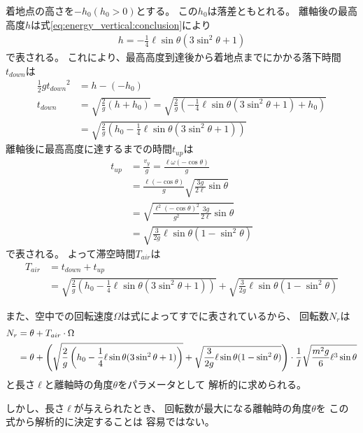 \documentclass[a4paper,11pt]{jsarticle}
\begin{document}
着地点の高さを$-h_0 (h_0>0)$とする。
この$h_0$は落差ともとれる。
離軸後の最高高度$h$は式\ref{eq:energy_vertical:conclusion}により
\begin{align*}
  h = -\frac{1}{4}\ell\sin\theta (3\sin^2\theta+1)
\end{align*}
で表される。
これにより、最高高度到達後から着地点までにかかる落下時間$t_{down}$は
\begin{align*}
  \frac{1}{2}g{t_{down}}^2
  &= h - (-h_0)
  \\
  t_{down}
  &= \sqrt{ \frac{2}{g} (h + h_0)}
  = \sqrt{ \frac{2}{g} \left( -\frac{1}{4}\ell\sin\theta (3\sin^2\theta+1) + h_0 \right) }
  \\
  & = \sqrt{ \frac{2}{g} \left( h_0 - \frac{1}{4}\ell\sin\theta (3\sin^2\theta+1) \right) }
\end{align*}
離軸後に最高高度に達するまでの時間$t_{up}$は
\begin{align*}
  t_{up} 
  &= \frac{v_y}{g} = \frac{\ell\omega(-\cos\theta)}{g}
  \\
  &= \frac{\ell(-\cos\theta)}{g} \sqrt{ \frac{3g}{2\ell} \sin\theta }
  \\
  &= \sqrt{ \frac{\ell^2(-\cos\theta)^2}{g^2} \frac{3g}{2\ell} \sin\theta }
  \\
  &= \sqrt{ \frac{3}{2g} \ell\sin\theta (1-\sin^2\theta) }
\end{align*}
で表される。
よって滞空時間$T_{air}$は
\begin{align*}
  T_{air} 
  &= t_{down} + t_{up}
  \\
  &= \sqrt{ \frac{2}{g} \left( h_0 - \frac{1}{4}\ell\sin\theta (3\sin^2\theta+1) \right) }
  + \sqrt{ \frac{3}{2g} \ell\sin\theta (1-\sin^2\theta) }
\end{align*}

また、空中での回転速度$\Omega$は式\label{eq:Omega}によってすでに表されているから、
回転数$N_r$は
\begin{align}
  N_r 
  &= \theta + T_{air} \cdot \Omega
  \notag
  \\
  &= \theta + 
  \left( \sqrt{ \frac{2}{g} \left( h_0 - \frac{1}{4}\ell\sin\theta (3\sin^2\theta+1) \right) }
    + \sqrt{ \frac{3}{2g} \ell\sin\theta (1-\sin^2\theta) } 
  \right)
  \cdot
  \frac{1}{I} \sqrt{ \frac{m^2 g}{6} \ell^3 \sin\theta }
  \label{eq:spin_number_conclusion}
\end{align}
と長さ$\ell$と離軸時の角度$\theta$をパラメータとして
解析的に求められる。

しかし、長さ$\ell$が与えられたとき、
回転数が最大になる離軸時の角度$\theta$を
この式から解析的に決定することは
容易ではない。
\end{document}
